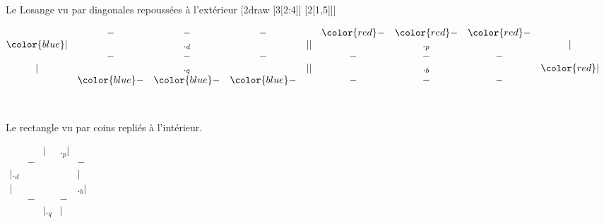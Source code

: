 \documentclass{article}
\newcommand{\blue}[1]{{\color{blue} #1}}
\newcommand{\red}[1]{{\color{red} #1}}
\begin{document}
Le Losange  vu par diagonales repoussées à l'extérieur [2draw [3[2:4]] [2[1,5]]]%
%

${\scriptscriptstyle\begin{matrix}
  & - & - & - &   \\
 \blue{|}&   &  ._d &   & | \\
  & - & - & - &   \\
| &   &  ._q &   & | \\
  &\blue{-}  &\blue{-}  &\blue{-}  &   \\
  &   &   &   &   \\
  &   &   &   &   \\
\end{matrix}
\begin{matrix}
  &\red{-}  &\red{-}  &\red{-} &   \\
| &   &  ._p &   & | \\
  & - & - & - &   \\
| &   &  ._b &   &\red {|}  \\
  & - & - & - &   \\
  &   &   &   &   \\
  &   &   &   &   \\
\end{matrix}}$

Le rectangle vu par coins repliés à l'intérieur.

${\scriptscriptstyle\begin{matrix}
  &  & | & ._p| &   \\
 & -  &   &   & - \\
|._d &    &  &  &  | \\
| &   &   &   & ._b| \\
  & - &  & - &   \\
  &   & |._q  &|   &   \\
  &   &   &   &   \\
\end{matrix}}$
\end{document}
